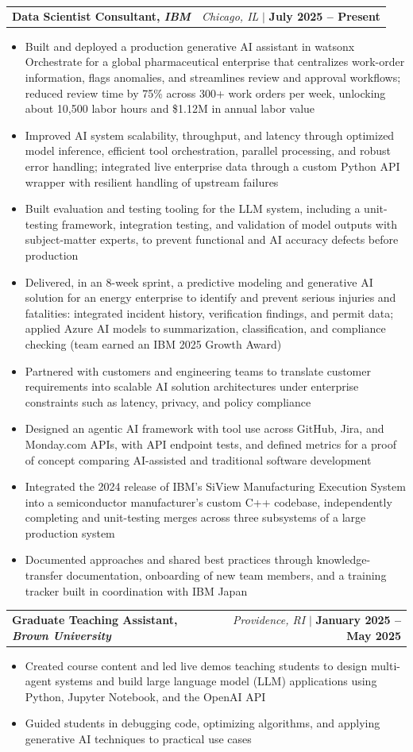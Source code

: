 \documentclass[letterpaper,10pt]{article}
\makeatletter
\newcommand{\resumeItem}[1]{
  \item\small{
    {#1 \vspace{-2pt}}
  }
}
\newcommand{\resumeSubheading}[4]{
  \item
  \begin{tabular*}{\textwidth}{l@{\extracolsep{\fill}}r}
    \textbf{#1, \small \emph{#3}} & \small{\emph{#4}} $|$ \small{\textbf{#2}} \\
  \end{tabular*}\vspace{-7pt}
}
\newcommand{\resumeItemListStart}{\begin{itemize}}
\newcommand{\resumeItemListEnd}{\end{itemize}\vspace{-5pt}}
\makeatother
\begin{document}
\resumeSubheading
  {Data Scientist Consultant}{July 2025 -- Present}
  {IBM}{Chicago, IL}
  \resumeItemListStart
    \resumeItem{Built and deployed a production generative AI assistant in watsonx Orchestrate for a global pharmaceutical enterprise that centralizes work-order information, flags anomalies, and streamlines review and approval workflows; reduced review time by 75\% across 300+ work orders per week, unlocking about 10,500 labor hours and \$1.12M in annual labor value}
    \resumeItem{Improved AI system scalability, throughput, and latency through optimized model inference, efficient tool orchestration, parallel processing, and robust error handling; integrated live enterprise data through a custom Python API wrapper with resilient handling of upstream failures}
    \resumeItem{Built evaluation and testing tooling for the LLM system, including a unit-testing framework, integration testing, and validation of model outputs with subject-matter experts, to prevent functional and AI accuracy defects before production}
    \resumeItem{Delivered, in an 8-week sprint, a predictive modeling and generative AI solution for an energy enterprise to identify and prevent serious injuries and fatalities: integrated incident history, verification findings, and permit data; applied Azure AI models to summarization, classification, and compliance checking (team earned an IBM 2025 Growth Award)}
    \resumeItem{Partnered with customers and engineering teams to translate customer requirements into scalable AI solution architectures under enterprise constraints such as latency, privacy, and policy compliance}
    \resumeItem{Designed an agentic AI framework with tool use across GitHub, Jira, and Monday.com APIs, with API endpoint tests, and defined metrics for a proof of concept comparing AI-assisted and traditional software development}
    \resumeItem{Integrated the 2024 release of IBM's SiView Manufacturing Execution System into a semiconductor manufacturer's custom C++ codebase, independently completing and unit-testing merges across three subsystems of a large production system}
    \resumeItem{Documented approaches and shared best practices through knowledge-transfer documentation, onboarding of new team members, and a training tracker built in coordination with IBM Japan}
  \resumeItemListEnd

\resumeSubheading
  {Graduate Teaching Assistant}{January 2025 -- May 2025}
  {Brown University}{Providence, RI}
  \resumeItemListStart
    \resumeItem{Created course content and led live demos teaching students to design multi-agent systems and build large language model (LLM) applications using Python, Jupyter Notebook, and the OpenAI API}
    \resumeItem{Guided students in debugging code, optimizing algorithms, and applying generative AI techniques to practical use cases}
  \resumeItemListEnd
\end{document}
